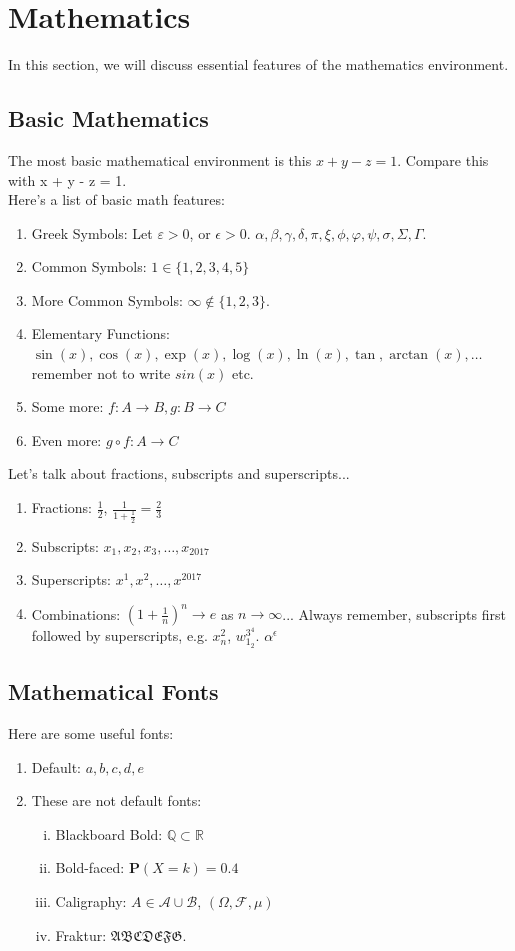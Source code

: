 \documentclass{article}
\begin{document}
	\newpage
	\section{Mathematics}
		In this section, we will discuss essential features of the mathematics environment.
		\subsection{Basic Mathematics}
			The most basic mathematical environment is this $x + y - z = 1$. Compare this with x + y - z = 1.\\
			Here's a list of basic math features:
			\begin{enumerate}
				\item Greek Symbols: Let $\varepsilon > 0$, or $\epsilon > 0$. $\alpha, \beta, \gamma, \delta, \pi, \xi, \phi, \varphi, \psi, \sigma, \Sigma, \Gamma$.
				\item Common Symbols: $1 \in \{1, 2, 3, 4, 5\}$
				\item More Common Symbols: $\infty \not \in \{1, 2, 3\}$.
				\item Elementary Functions: $\sin(x), \cos(x), \exp(x), \log(x), \ln(x), \tan, \arctan(x), \dots$ remember not to write $sin(x)$ etc.
				\item Some more: $f : A \to B, g: B \to C$
				\item Even more: $g \circ f : A \to C$
			\end{enumerate}
			Let's talk about fractions, subscripts and superscripts...
			\begin{enumerate}
				\item Fractions: $\frac{1}{2}$, $\frac{1}{1 +\frac{1}{2}} = \frac{2}{3}$
				\item Subscripts: $x_{1}, x_{2}, x_{3}, \dots, x_{2017}$
				\item Superscripts: $x^{1}, x^{2}, \dots, x^{2017}$
				\item Combinations: $(1 + \frac{1}{n})^{n} \to e$ as $n \to \infty$... Always remember, subscripts first followed by superscripts, e.g. $x_{n}^{2}$, $w_{1_{2}}^{3^{4}}$. $\alpha^{\epsilon}$
			\end{enumerate}
		\subsection{Mathematical Fonts}
			Here are some useful fonts:
			\begin{enumerate}
				\item Default: $a, b, c, d, e$
				\item These are not default fonts:
				\begin{enumerate}[(i)]
					\item Blackboard Bold: $\mathbb{Q} \subset \mathbb{R}$
					\item Bold-faced: $\mathbf{P}(X = k) = 0.4$
					\item Caligraphy: $A \in \mathcal{A} \cup \mathcal{B}$, $(\Omega, \mathcal{F}, \mu)$
					\item Fraktur: $\mathfrak{ABCDEFG}$.
				\end{enumerate}
			\end{enumerate}
\end{document}
